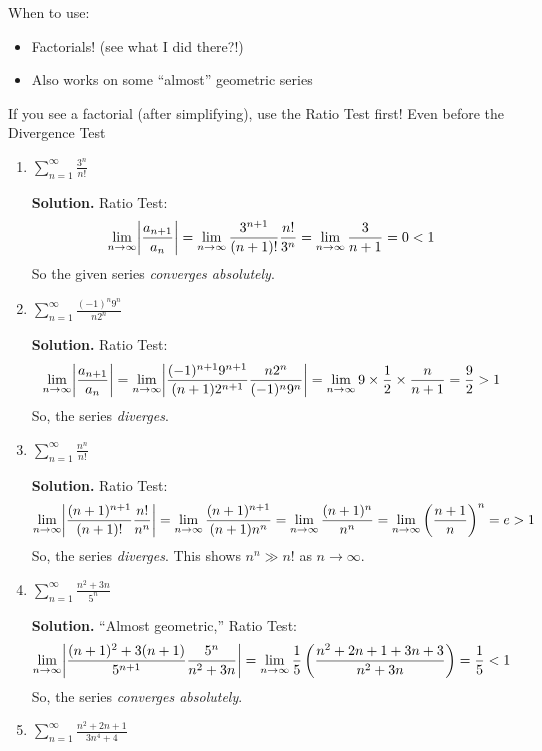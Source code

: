 \begin{Remark}{}{}
    When to use:
    \begin{itemize}
        \item Factorials! (see what I did there?!)
        \item Also works on some ``almost'' geometric series
    \end{itemize}
    If you see a factorial (after simplifying), use the Ratio Test first! Even
    before the Divergence Test
\end{Remark}

\begin{Example}{}{}
    \begin{enumerate}
        \item $ \displaystyle \sum\limits_{n=1}^{\infty} \frac{3^n}{n!} $

              \textbf{Solution.} Ratio Test:
              \[ \lim\limits_{{n} \to {\infty}} \abs*{\frac{a_{n+1}}{a_n}}=
                  \lim\limits_{{n} \to {\infty}} \frac{3^{n+1}}{(n+1)!}\frac{n!}{3^n}
                  =\lim\limits_{{n} \to {\infty}} \frac{3}{n+1}=0<1 \]
              So the given series \emph{converges absolutely}.
        \item $ \displaystyle \sum\limits_{n=1}^{\infty} \frac{(-1)^n9^n}{n2^n} $

              \textbf{Solution.} Ratio Test:
              \[ \lim\limits_{{n} \to {\infty}} \abs*{\frac{a_{n+1}}{a_n}}=
                  \lim\limits_{{n} \to {\infty}}
                  \abs*{\frac{(-1)^{n+1}9^{n+1}}{(n+1)2^{n+1}}\frac{n2^n}{(-1)^n9^n}}
                  =\lim\limits_{{n} \to {\infty}} 9\times \frac{1}{2} \times \frac{n}{n+1}
                  =\frac{9}{2} >1 \]
              So, the series \emph{diverges}.
        \item $ \displaystyle \sum\limits_{n=1}^{\infty}\frac{n^n}{n!} $

              \textbf{Solution.} Ratio Test:
              \[ \lim\limits_{{n} \to {\infty}} \abs*{\frac{(n+1)^{n+1}}{(n+1)!}\frac{n!}{n^n}}
                  =\lim\limits_{{n} \to {\infty}} \frac{(n+1)^{n+1}}{(n+1)n^n}
                  =\lim\limits_{{n} \to {\infty}} \frac{(n+1)^n}{n^n}
                  =\lim\limits_{{n} \to {\infty}} \left( \frac{n+1}{n}  \right)^n=e>1  \]
              So, the series \emph{diverges}. This shows $ n^n\gg n! $ as $ n\to\infty $.
        \item $ \displaystyle \sum\limits_{n=1}^{\infty} \frac{n^2+3n}{5^n}  $

              \textbf{Solution.} ``Almost geometric,'' Ratio Test:
              \[ \lim\limits_{{n} \to {\infty}}\abs*{\frac{(n+1)^2+3(n+1)}{5^{n+1}}\frac{5^n}{n^2+3n}}
                  =\lim\limits_{{n} \to {\infty}} \frac{1}{5} \left( \frac{n^2+2n+1+3n+3}{n^2+3n} \right)
                  =\frac{1}{5}
                  <1 \]
              So, the series \emph{converges absolutely}.
        \item $ \displaystyle \sum\limits_{n=1}^{\infty} \frac{n^2+2n+1}{3n^4+4} $


\end{enumerate}
\end{Example}

